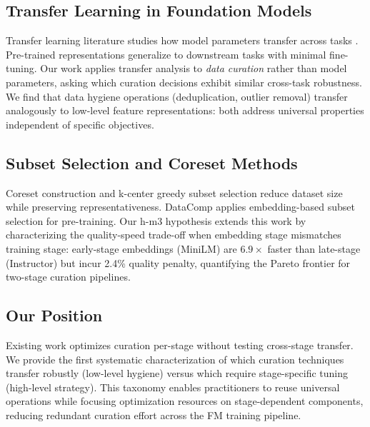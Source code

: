 \subsection{Transfer Learning in Foundation Models}

Transfer learning literature studies how model parameters transfer across tasks \cite{howard2018universal, devlin2019bert, brown2020language}. Pre-trained representations generalize to downstream tasks with minimal fine-tuning. Our work applies transfer analysis to \emph{data curation} rather than model parameters, asking which curation decisions exhibit similar cross-task robustness. We find that data hygiene operations (deduplication, outlier removal) transfer analogously to low-level feature representations: both address universal properties independent of specific objectives.

\subsection{Subset Selection and Coreset Methods}

Coreset construction \cite{feldman2011scalable} and k-center greedy subset selection \cite{sener2018active} reduce dataset size while preserving representativeness. DataComp applies embedding-based subset selection for pre-training. Our h-m3 hypothesis extends this work by characterizing the quality-speed trade-off when embedding stage mismatches training stage: early-stage embeddings (MiniLM) are $6.9\times$ faster than late-stage (Instructor) but incur 2.4\% quality penalty, quantifying the Pareto frontier for two-stage curation pipelines.

\subsection{Our Position}

Existing work optimizes curation per-stage without testing cross-stage transfer. We provide the first systematic characterization of which curation techniques transfer robustly (low-level hygiene) versus which require stage-specific tuning (high-level strategy). This taxonomy enables practitioners to reuse universal operations while focusing optimization resources on stage-dependent components, reducing redundant curation effort across the FM training pipeline.
